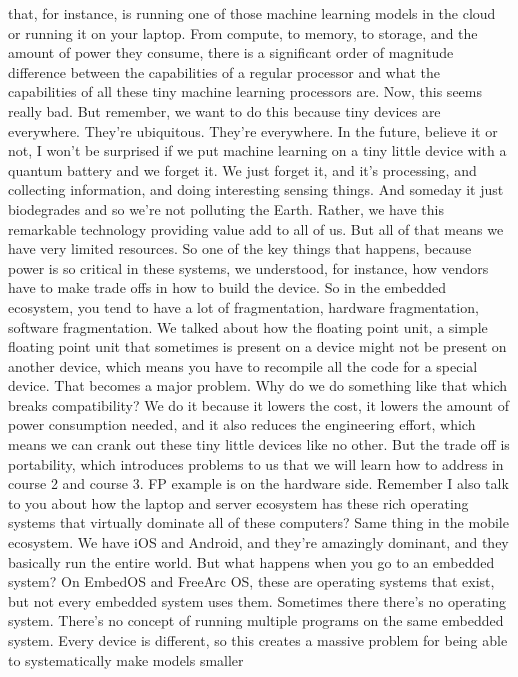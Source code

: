 that, for instance, is running one of those machine learning
models in the cloud or running it on your laptop.
From compute, to memory, to storage, and the amount of power
they consume, there is a significant order
of magnitude difference between the capabilities of a regular processor
and what the capabilities of all these tiny machine learning processors are.
Now, this seems really bad.
But remember, we want to do this because tiny devices are everywhere.
They're ubiquitous.
They're everywhere.
In the future, believe it or not, I won't be surprised
if we put machine learning on a tiny little device with a quantum battery
and we forget it.
We just forget it, and it's processing, and collecting information,
and doing interesting sensing things.
And someday it just biodegrades and so we're not polluting the Earth.
Rather, we have this remarkable technology
providing value add to all of us.
But all of that means we have very limited resources.
So one of the key things that happens, because power
is so critical in these systems, we understood, for instance,
how vendors have to make trade offs in how to build the device.
So in the embedded ecosystem, you tend to have
a lot of fragmentation, hardware fragmentation, software fragmentation.
We talked about how the floating point unit, a simple floating point
unit that sometimes is present on a device
might not be present on another device, which
means you have to recompile all the code for a special device.
That becomes a major problem.
Why do we do something like that which breaks compatibility?
We do it because it lowers the cost, it lowers
the amount of power consumption needed, and it also
reduces the engineering effort, which means
we can crank out these tiny little devices like no other.
But the trade off is portability, which introduces problems
to us that we will learn how to address in course 2 and course 3.
FP example is on the hardware side.
Remember I also talk to you about how the laptop and server
ecosystem has these rich operating systems that virtually
dominate all of these computers?
Same thing in the mobile ecosystem.
We have iOS and Android, and they're amazingly dominant,
and they basically run the entire world.
But what happens when you go to an embedded system?
On EmbedOS and FreeArc OS, these are operating systems that exist,
but not every embedded system uses them.
Sometimes there there's no operating system.
There's no concept of running multiple programs on the same embedded system.
Every device is different, so this creates a massive problem
for being able to systematically make models smaller
